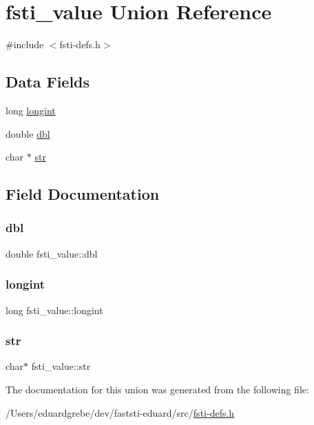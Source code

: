 \hypertarget{unionfsti__value}{}\section{fsti\+\_\+value Union Reference}
\label{unionfsti__value}


{\ttfamily \#include $<$fsti-\/defs.\+h$>$}

\subsection*{Data Fields}
\begin{DoxyCompactItemize}
\item 
long \mbox{\hyperlink{unionfsti__value_a447fe3b0025c905b135bd83644de1835}{longint}}
\item 
double \mbox{\hyperlink{unionfsti__value_abc19a0fa0d2b51651557de2996a20ae7}{dbl}}
\item 
char $\ast$ \mbox{\hyperlink{unionfsti__value_a516816f638918a4896c2405c707d37c9}{str}}
\end{DoxyCompactItemize}


\subsection{Field Documentation}
\mbox{\label{unionfsti__value_abc19a0fa0d2b51651557de2996a20ae7}} 
\subsubsection{\texorpdfstring{dbl}{dbl}}
{\footnotesize\ttfamily double fsti\+\_\+value\+::dbl}

\mbox{\label{unionfsti__value_a447fe3b0025c905b135bd83644de1835}} 
\subsubsection{\texorpdfstring{longint}{longint}}
{\footnotesize\ttfamily long fsti\+\_\+value\+::longint}

\mbox{\label{unionfsti__value_a516816f638918a4896c2405c707d37c9}} 
\subsubsection{\texorpdfstring{str}{str}}
{\footnotesize\ttfamily char$\ast$ fsti\+\_\+value\+::str}



The documentation for this union was generated from the following file\+:\begin{DoxyCompactItemize}
\item 
/\+Users/eduardgrebe/dev/faststi-\/eduard/src/\mbox{\hyperlink{fsti-defs_8h}{fsti-\/defs.\+h}}\end{DoxyCompactItemize}
